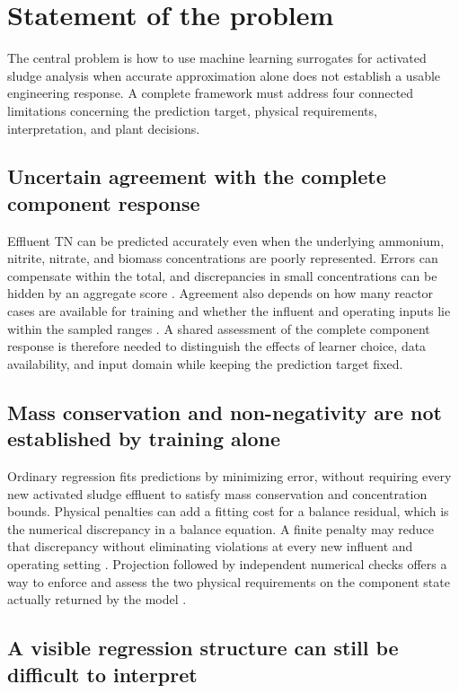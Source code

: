 \section{Statement of the problem}

The central problem is how to use machine learning surrogates for activated sludge analysis when accurate approximation alone does not establish a usable engineering response. A complete framework must address four connected limitations concerning the prediction target, physical requirements, interpretation, and plant decisions.

\subsection{Uncertain agreement with the complete component response}

Effluent TN can be predicted accurately even when the underlying ammonium, nitrite, nitrate, and biomass concentrations are poorly represented. Errors can compensate within the total, and discrepancies in small concentrations can be hidden by an aggregate score \citep{Henze2006,Selerio2026}. Agreement also depends on how many reactor cases are available for training and whether the influent and operating inputs lie within the sampled ranges \citep{VieringLoog2023,Li2024}. A shared assessment of the complete component response is therefore needed to distinguish the effects of learner choice, data availability, and input domain while keeping the prediction target fixed.

\subsection{Mass conservation and non-negativity are not established by training alone}

Ordinary regression fits predictions by minimizing error, without requiring every new activated sludge effluent to satisfy mass conservation and concentration bounds. Physical penalties can add a fitting cost for a balance residual, which is the numerical discrepancy in a balance equation. A finite penalty may reduce that discrepancy without eliminating violations at every new influent and operating setting \citep{Raissi2019,Hansen2024}. Projection followed by independent numerical checks offers a way to enforce and assess the two physical requirements on the component state actually returned by the model \citep{KircherVotsmeier2025,Selerio2026}.

\subsection{A visible regression structure can still be difficult to interpret}

